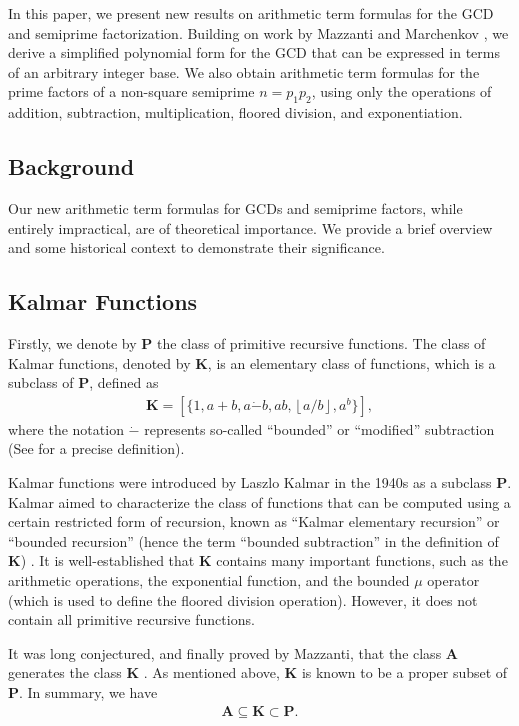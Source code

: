 \documentclass[11pt,reqno]{article}
\theoremstyle{plain}
\theoremstyle{definition}
\newcommand{\floor}[1]{\left\lfloor #1 \right\rfloor}
\begin{document}
In this paper, we present new results on arithmetic term formulas for the GCD and semiprime factorization. Building on work by Mazzanti and Marchenkov \cite{mazzanti2002plainbases, marchenkov1980superposition}, we derive a simplified polynomial form for the GCD that can be expressed in terms of an arbitrary integer base. We also obtain arithmetic term formulas for the prime factors of a non-square semiprime $n=p_1 p_2$, using only the operations of addition, subtraction, multiplication, floored division, and exponentiation.

\subsection{Background}
Our new arithmetic term formulas for GCDs and semiprime factors, while entirely impractical, are of theoretical importance. We provide a brief overview and some historical context to demonstrate their significance.

\subsection{Kalmar Functions} \label{subsection:kalmar}
Firstly, we denote by $\textbf{P}$ the class of primitive recursive functions. The class of Kalmar functions, denoted by $\textbf{K}$, is an elementary class of functions, which is a subclass of $\textbf{P}$, defined as
\begin{align*}
    \textbf{K} = [\{ 1, a+b, a\Dot{-}b, ab, \floor{a/b}, a^b \}],
\end{align*}
where the notation $\Dot{-}$ represents so-called ``bounded'' or ``modified'' subtraction (See \cite{mazzanti2002plainbases} for a precise definition).

Kalmar functions were introduced by Laszlo Kalmar in the 1940s as a subclass \textbf{P}. Kalmar aimed to characterize the class of functions that can be computed using a certain restricted form of recursion, known as ``Kalmar elementary recursion'' or ``bounded recursion'' (hence the term ``bounded subtraction'' in the definition of $\textbf{K}$) \cite{herman1969elementary}. It is well-established that $\textbf{K}$ contains many important functions, such as the arithmetic operations, the exponential function, and the bounded $\mu$ operator (which is used to define the floored division operation). However, it does not contain all primitive recursive functions.

It was long conjectured, and finally proved by Mazzanti, that the class $\textbf{A}$ generates the class $\textbf{K}$ \cite{mazzanti2002plainbases, marchenkov2007superposition}. As mentioned above, $\textbf{K}$ is known to be a proper subset of $\textbf{P}$. In summary, we have
\begin{align*}
    \textbf{A} \subseteq \textbf{K} \subset \textbf{P} .
\end{align*}
\end{document}
